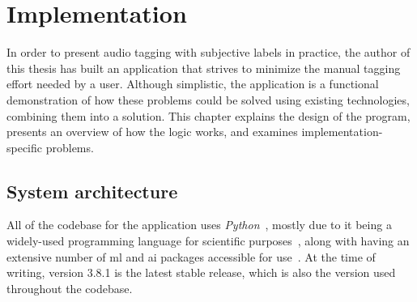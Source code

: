 \bgroup{}

\chapter{Implementation}\label{cha:implementation}
In order to present audio tagging with subjective labels in practice, the author of this thesis has built an application that strives to minimize the manual tagging effort needed by a user. Although simplistic, the application is a functional demonstration of how these problems could be solved using existing technologies, combining them into a solution. This chapter explains the design of the program, presents an overview of how the logic works, and examines implementation-specific problems.

\section{System architecture}
All of the codebase for the application uses \emph{Python}~\cite{python}, mostly due to it being a widely-used programming language for scientific purposes~\cite{python:survey}, along with having an extensive number of \gls{ml} and \gls{ai} packages accessible for use~\cite{python:about}. At the time of writing, version 3.8.1 is the latest stable release, which is also the version used throughout the codebase.

